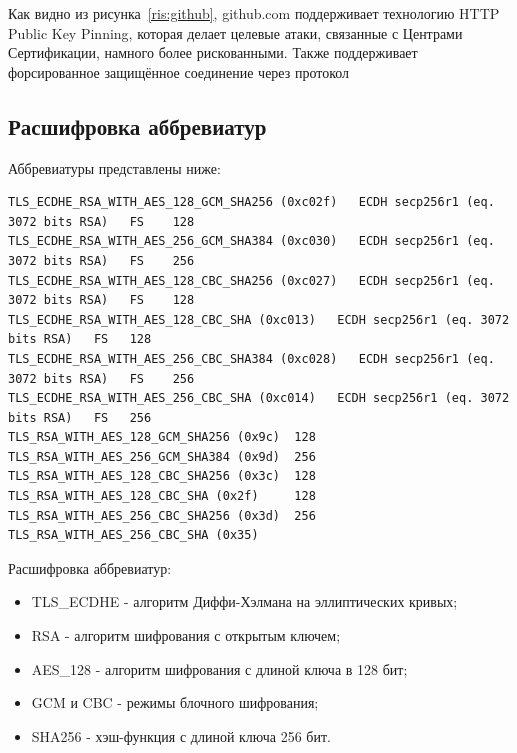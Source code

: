\documentclass[10pt,a4paper]{report}
\begin{document}
			Как видно из рисунка~\ref{ris:github}, github.com поддерживает технологию HTTP Public Key Pinning, которая делает целевые атаки, связанные с Центрами Сертификации, намного более рискованными. Также поддерживает форсированное защищённое соединение через протокол
			
		\subsection{Расшифровка аббревиатур}
			Аббревиатуры представлены ниже:
			\begin{lstlisting}
TLS_ECDHE_RSA_WITH_AES_128_GCM_SHA256 (0xc02f)   ECDH secp256r1 (eq. 3072 bits RSA)   FS 	128
TLS_ECDHE_RSA_WITH_AES_256_GCM_SHA384 (0xc030)   ECDH secp256r1 (eq. 3072 bits RSA)   FS 	256
TLS_ECDHE_RSA_WITH_AES_128_CBC_SHA256 (0xc027)   ECDH secp256r1 (eq. 3072 bits RSA)   FS 	128
TLS_ECDHE_RSA_WITH_AES_128_CBC_SHA (0xc013)   ECDH secp256r1 (eq. 3072 bits RSA)   FS 	128
TLS_ECDHE_RSA_WITH_AES_256_CBC_SHA384 (0xc028)   ECDH secp256r1 (eq. 3072 bits RSA)   FS 	256
TLS_ECDHE_RSA_WITH_AES_256_CBC_SHA (0xc014)   ECDH secp256r1 (eq. 3072 bits RSA)   FS 	256
TLS_RSA_WITH_AES_128_GCM_SHA256 (0x9c) 	128
TLS_RSA_WITH_AES_256_GCM_SHA384 (0x9d) 	256
TLS_RSA_WITH_AES_128_CBC_SHA256 (0x3c) 	128
TLS_RSA_WITH_AES_128_CBC_SHA (0x2f) 	128
TLS_RSA_WITH_AES_256_CBC_SHA256 (0x3d) 	256
TLS_RSA_WITH_AES_256_CBC_SHA (0x35) 
			\end{lstlisting}
			
			Расшифровка аббревиатур:
			\begin{itemize}
				\item TLS\_ECDHE - алгоритм Диффи-Хэлмана на эллиптических кривых;
				\item RSA - алгоритм шифрования с открытым ключем;
				\item AES\_128 - алгоритм шифрования с длиной ключа в 128 бит;
				\item GCM и CBC - режимы блочного шифрования;
				\item SHA256 - хэш-функция с длиной ключа 256 бит.
			\end{itemize}
			
\end{document}
